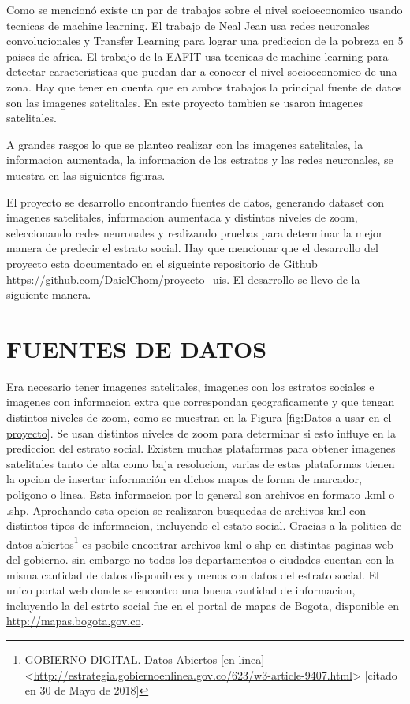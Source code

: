 Como se mencionó existe un par de trabajos sobre el nivel socioeconomico usando tecnicas de machine learning. El trabajo de Neal Jean usa redes neuronales convolucionales y Transfer Learning para lograr una prediccion de la pobreza en 5 paises de africa. El trabajo de la EAFIT usa tecnicas de machine learning para detectar caracteristicas que puedan dar a conocer el nivel socioeconomico de una zona. Hay que tener en cuenta que en ambos trabajos la principal fuente de datos son las imagenes satelitales. En este proyecto tambien se usaron imagenes satelitales.
 
A grandes rasgos lo que se planteo realizar con las imagenes satelitales, la informacion aumentada, la informacion de los estratos y las redes neuronales, se muestra en las siguientes figuras.


El proyecto se desarrollo encontrando fuentes de datos, generando dataset con imagenes satelitales, informacion aumentada y distintos niveles de zoom, seleccionando redes neuronales y realizando pruebas para determinar la mejor manera de predecir el estrato social. Hay que mencionar que el desarrollo del proyecto esta documentado en el sigueinte repositorio de Github \url{https://github.com/DaielChom/proyecto_uis}. El desarrollo se llevo de la siguiente manera.

 
 \section{FUENTES DE DATOS}
 
 Era necesario tener imagenes satelitales, imagenes con los estratos sociales e imagenes con informacion extra que correspondan geograficamente y que tengan distintos niveles de zoom, como se muestran en la Figura  \ref{fig:Datos a usar en el proyecto}. Se usan distintos niveles de zoom para determinar si esto influye en la prediccion del estrato social.  
 Existen muchas plataformas para obtener imagenes satelitales tanto de alta como baja resolucion, varias de estas plataformas tienen la opcion de insertar información en dichos mapas de forma de marcador, poligono o linea. Esta informacion por lo general son archivos en formato .kml o .shp. Aprochando esta opcion se realizaron busquedas de archivos kml con distintos tipos de informacion, incluyendo el estato social. Gracias a la politica de datos abiertos\footnote[13]{GOBIERNO DIGITAL. Datos Abiertos [en linea] <\url{http://estrategia.gobiernoenlinea.gov.co/623/w3-article-9407.html}> [citado en 30 de Mayo de 2018]} es psobile encontrar archivos kml o shp en distintas paginas web del gobierno. sin embargo no todos los departamentos o ciudades cuentan con la misma cantidad de datos disponibles y menos con datos del estrato social. El unico portal web donde se encontro una buena cantidad de informacion, incluyendo la del estrto social fue en el portal de mapas de Bogota, disponible en \url{http://mapas.bogota.gov.co}. 
 
